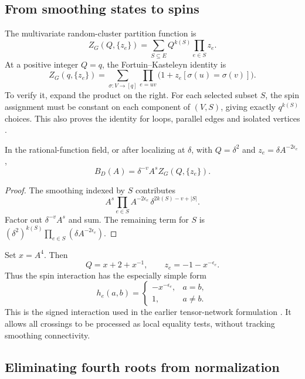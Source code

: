 \subsection{From smoothing states to spins}

The multivariate random-cluster partition function is
\[
 Z_G(Q,\{z_e\})=\sum_{S\subseteq E}Q^{k(S)}\prod_{e\in S}z_e.
\]
At a positive integer $Q=q$, the Fortuin--Kasteleyn identity is
\begin{equation}
 Z_G(q,\{z_e\})
 =\sum_{\sigma:V\to[q]}
   \prod_{e=uv}\bigl(1+z_e[\sigma(u)=\sigma(v)]\bigr).
 \label{eq:fk}
\end{equation}
To verify it, expand the product on the right. For each selected subset
$S$, the spin assignment must be constant on each component of $(V,S)$,
giving exactly $q^{k(S)}$ choices. This also proves the identity for loops,
parallel edges and isolated vertices \cite{sokal2005}.

\begin{proposition}\label{prop:potts}
In the rational-function field, or after localizing at $\delta$, with
$Q=\delta^2$ and $z_e=\delta A^{-2\epsilon_e}$,
\begin{equation}
 B_D(A)=\delta^{-v}A^s Z_G(Q,\{z_e\}).
 \label{eq:full-bracket}
\end{equation}
\end{proposition}
\begin{proof}
The smoothing indexed by $S$ contributes
\[
 A^s\prod_{e\in S}A^{-2\epsilon_e}\,
 \delta^{2k(S)-v+|S|}.
\]
Factor out $\delta^{-v}A^s$ and sum. The remaining term for $S$ is
$(\delta^2)^{k(S)}\prod_{e\in S}(\delta A^{-2\epsilon_e})$.
\end{proof}

Set $x=A^4$. Then
\[
 Q=x+2+x^{-1},\qquad z_e=-1-x^{-\epsilon_e}.
\]
Thus the spin interaction has the especially simple form
\begin{equation}
 h_e(a,b)=
 \begin{cases}
  -x^{-\epsilon_e},&a=b,\\
  1,&a\ne b.
 \end{cases}
 \label{eq:interaction}
\end{equation}
This is the signed interaction used in the earlier tensor-network
formulation \cite{meichanetzidis2019}. It allows all crossings to be processed
as local equality tests, without tracking smoothing connectivity.

\subsection{Eliminating fourth roots from normalization}

